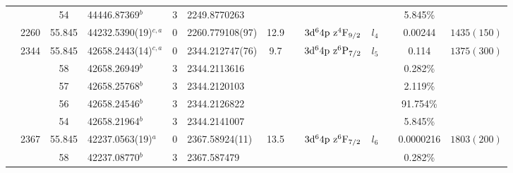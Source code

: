 \begin{table*}
\begin{center}
{\begin{tabular}{:l;l;c;l;c;l;c;l;l;c;c;c;c}
\rowstyle{\itshape}               &        & 54        & 44446.87369$^{b}$                & 3 &  2249.8770263      &      & $                                        $ & $                                        $ & $      $ &              & 5.845\%   & $          $\\
                                  & 2260   & 55.845    & 44232.5390(19)$^{c,a}$           & 0 &   2260.779108(97)  & 12.9 & $                                        $ & $3\rm{d}^64\rm{p~z}^4\rm{F}_{9/2}        $ & $l_{4} $ &              & 0.00244   & $ 1435(150)$\\
                                  & 2344   & 55.845    & 42658.2443(14)$^{c,a}$           & 0 &   2344.212747(76)  &  9.7 & $                                        $ & $3\rm{d}^64\rm{p~z}^6\rm{P}_{7/2}        $ & $l_{5} $ &              & 0.114     & $ 1375(300)$\\
\rowstyle{\itshape}               &        & 58        & 42658.26949$^{b}$                & 3 &  2344.2113616      &      & $                                        $ & $                                        $ & $      $ &              & 0.282\%   & $          $\\
\rowstyle{\itshape}               &        & 57        & 42658.25768$^{b}$                & 3 &  2344.2120103      &      & $                                        $ & $                                        $ & $      $ &              & 2.119\%   & $          $\\
\rowstyle{\itshape}               &        & 56        & 42658.24546$^{b}$                & 3 &  2344.2126822      &      & $                                        $ & $                                        $ & $      $ &              & 91.754\%  & $          $\\
\rowstyle{\itshape}               &        & 54        & 42658.21964$^{b}$                & 3 &  2344.2141007      &      & $                                        $ & $                                        $ & $      $ &              & 5.845\%   & $          $\\
                                  & 2367   & 55.845    & 42237.0563(19)$^{a}$             & 0 &    2367.58924(11)  & 13.5 & $                                        $ & $3\rm{d}^64\rm{p~z}^6\rm{F}_{7/2}        $ & $l_{6} $ &              & 0.0000216 & $ 1803(200)$\\
\rowstyle{\itshape}               &        & 58        & 42237.08770$^{b}$                & 3 &   2367.587479      &      & $                                        $ & $                                        $ & $      $ &              & 0.282\%   & $          $\\

\end{tabular}}
\end{center}
\end{table*}
